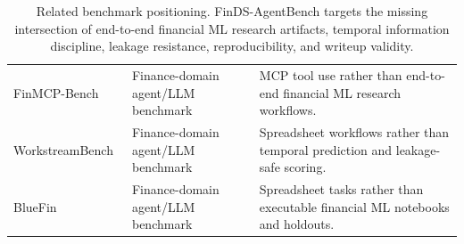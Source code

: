 \begin{table}[t]
{\begin{tabular}{lll}
FinMCP-Bench~\cite{finmcpbench2026} & Finance-domain agent/LLM benchmark & MCP tool use rather than end-to-end financial ML research workflows. \\
WorkstreamBench~\cite{workstreambench2026} & Finance-domain agent/LLM benchmark & Spreadsheet workflows rather than temporal prediction and leakage-safe scoring. \\
BlueFin~\cite{bluefin2026} & Finance-domain agent/LLM benchmark & Spreadsheet tasks rather than executable financial ML notebooks and holdouts. \\
\bottomrule
\end{tabular}
}
\caption{Related benchmark positioning. FinDS-AgentBench targets the missing intersection of end-to-end financial ML research artifacts, temporal information discipline, leakage resistance, reproducibility, and writeup validity.}
\label{tab:related-work-positioning}
\end{table}
